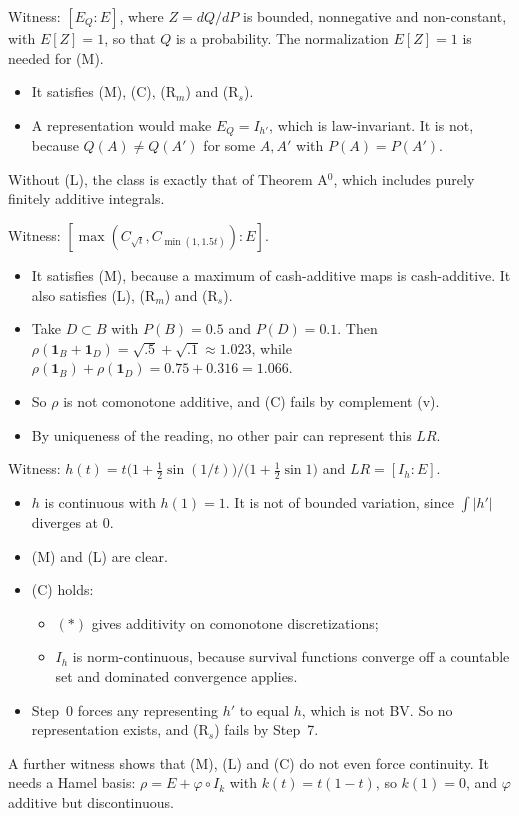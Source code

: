 \begin{example}[(L)]
Witness: $[E_Q:E]$, where $Z=dQ/dP$ is bounded, nonnegative and non-constant, with $E[Z]=1$, so that $Q$ is a probability. The normalization $E[Z]=1$ is needed for (M).
\begin{itemize}
\item It satisfies (M), (C), (R$_m$) and (R$_s$).
\item A representation would make $E_Q=I_{h'}$, which is law-invariant. It is not, because $Q(A)\ne Q(A')$ for some $A,A'$ with $P(A)=P(A')$.
\end{itemize}
Without (L), the class is exactly that of Theorem A$^0$, which includes purely finitely additive integrals.
\end{example}

\begin{example}[(C)]
Witness: $[\max(C_{\sqrt t},C_{\min(1,1.5t)}):E]$.
\begin{itemize}
\item It satisfies (M), because a maximum of cash-additive maps is cash-additive. It also satisfies (L), (R$_m$) and (R$_s$).
\item Take $D\subset B$ with $P(B)=0.5$ and $P(D)=0.1$. Then $\rho(\mathbf 1_B+\mathbf 1_D)=\sqrt{.5}+\sqrt{.1}\approx1.023$, while $\rho(\mathbf 1_B)+\rho(\mathbf 1_D)=0.75+0.316=1.066$.
\item So $\rho$ is not comonotone additive, and (C) fails by complement (v).
\item By uniqueness of the reading, no other pair can represent this $LR$.
\end{itemize}
\end{example}

\begin{example}[(R$_s$) in Theorem A]
Witness: $h(t)=t\big(1+\tfrac12\sin(1/t)\big)/\big(1+\tfrac12\sin1\big)$ and $LR=[I_h:E]$.
\begin{itemize}
\item $h$ is continuous with $h(1)=1$. It is not of bounded variation, since $\int|h'|$ diverges at $0$.
\item (M) and (L) are clear.
\item (C) holds:
  \begin{itemize}
  \item $(*)$ gives additivity on comonotone discretizations;
  \item $I_h$ is norm-continuous, because survival functions converge off a countable set and dominated convergence applies.
  \end{itemize}
\item Step~0 forces any representing $h'$ to equal $h$, which is not BV. So no representation exists, and (R$_s$) fails by Step~7.
\end{itemize}
A further witness shows that (M), (L) and (C) do not even force continuity. It needs a Hamel basis: $\rho=E+\varphi\circ I_k$ with $k(t)=t(1-t)$, so $k(1)=0$, and $\varphi$ additive but discontinuous.
\end{example}

